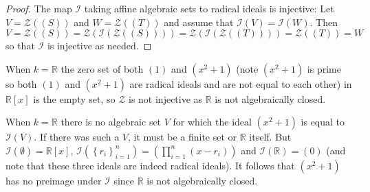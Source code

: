 \documentclass[11pt]{article}
\newcommand{\cbr}[1]{\left\{#1\right\}}
\begin{document}
\begin{enumerate}
\begin{proof}
    The map $\mathcal{I}$ taking affine algebraic sets to radical ideals is injective: Let $V = \mathcal{Z}((S))$ and $W = \mathcal{Z}((T))$ and assume that $\mathcal{I}(V) = \mathcal{I}(W)$. Then \[V = \mathcal{Z}((S)) = \mathcal{Z}(\mathcal{I}(\mathcal{Z}((S)))) = \mathcal{Z}(\mathcal{I}(\mathcal{Z}((T)))) = \mathcal{Z}((T)) = W\] so that $\mathcal{I}$ is injective as needed. 
    \end{proof}

    When $k=\mathbb{R}$ the zero set of both $(1)$ and $(x^2+1)$ (note $(x^2+1)$ is prime so both $(1)$ and $(x^2+1)$ are radical ideals and are not equal to each other) in $\mathbb{R}[x]$ is the empty set, so $\mathcal{Z}$ is not injective as $\mathbb{R}$ is not algebraically closed.

    When $k = \mathbb{R}$ there is no algebraic set $V$ for which the ideal $ (x^2+1)$ is equal to $\mathcal{I}(V)$. If there was such a $V$, it must be a finite set or $\mathbb{R}$ itself. But $\mathcal{I}(\emptyset) = \mathbb{R}[x]$, $\mathcal{I}(\cbr{r_i}_{i=1}^n) = (\prod_{i=1}^n (x-r_i))$ and $\mathcal{I}(\mathbb{R}) = (0)$ (and note that these three ideals are indeed radical ideals). It follows that $(x^2+1)$ has no preimage under $\mathcal{I}$ since $\mathbb{R}$ is not algebraically closed.
\end{enumerate}
\end{document}
